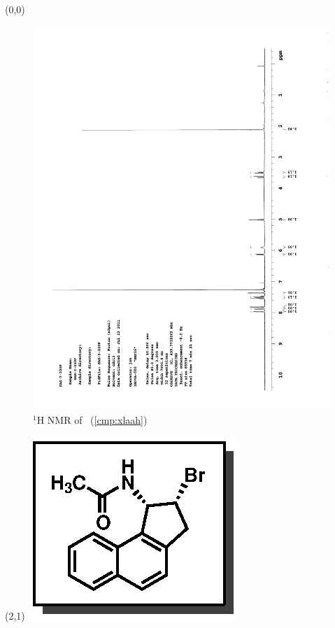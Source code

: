 \begin{textblock}{20}(0,0)
\begin{figure}[htb]
\caption{$^1$H NMR of \CMPxlaah\ (\ref{cmp:xlaah})}
\includegraphics[scale=0.75, trim = 0mm 0mm 0mm 5mm,
clip]{chp_asymmetric/images/nmr/xlaahH}
\vspace{-100pt}
\end{figure}
\end{textblock}
\begin{textblock}{1}(2,1)
\includegraphics[scale=0.8, angle=90]{chp_asymmetric/images/xlaah}
\end{textblock}
